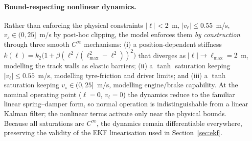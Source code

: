 \documentclass[11pt,a4paper]{article}
\begin{document}
\paragraph{Bound-respecting nonlinear dynamics.}
Rather than enforcing the physical constraints $|\ell|<2$~m,
$|v_\ell|\le0.55$~m/s, $v_s\in(0,25]$~m/s by post-hoc clipping, the
model enforces them \emph{by construction} through three smooth
$C^{\infty}$ mechanisms: (i) a position-dependent stiffness
$k(\ell)=k_2\bigl(1+\beta(\ell^2/(\ell_{\max}^2-\ell^2))^2\bigr)$
that diverges as $|\ell|\to\ell_{\max}=2$~m, modelling the track walls
as elastic barriers; (ii) a $\tanh$ saturation keeping $|v_\ell|\le
0.55$~m/s, modelling tyre-friction and driver limits; and (iii) a
$\tanh$ saturation keeping $v_s\in(0,25]$~m/s, modelling engine/brake
capability. At the nominal operating point ($\ell=0$, $v_\ell=0$) the
dynamics reduce to the familiar linear spring--damper form, so normal
operation is indistinguishable from a linear Kalman filter; the
nonlinear terms activate only near the physical bounds. Because all
saturations are $C^{\infty}$, the dynamics remain differentiable
everywhere, preserving the validity of the EKF linearisation used in
Section~\ref{sec:ekf}.
\end{document}
